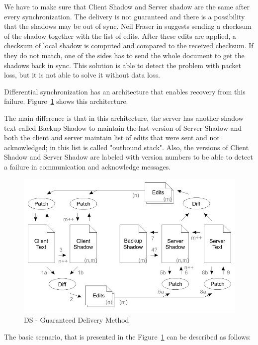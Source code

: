 \documentclass[12pt,oneside]{fithesis2}
\begin{document}
\par We have to make sure that Client Shadow and Server shadow are the same after every synchronization. The delivery is not guaranteed and there is a possibility that the shadows may be out of sync. Neil Fraser in \cite{Fraser} suggests sending a checksum of the shadow together with the list of edits. After these edits are applied, a checksum of local shadow is computed and compared to the received checksum. If they do not match, one of the sides has to send the whole document to get the shadows back in sync. This solution is able to detect the problem with packet loss, but it is not able to solve it without data loss.
\par Differential synchronization has an architecture that enables recovery from this failure. Figure~\ref{fig:ds2} shows this architecture.
\par The main difference is that in this architecture, the server has another shadow text called Backup Shadow to maintain the last version of Server Shadow and both the client and server maintain list of edits that were sent and not acknowledged; in \cite{Fraser} this list is called "outbound stack". Also, the versions of Client Shadow and Server Shadow are labeled with version numbers to be able to detect a failure in communication and acknowledge messages.
\begin{figure}[H]
\caption{DS - Guaranteed Delivery Method \cite{Fraser}}
\label{fig:ds2}
\centering
\vspace{5mm}
\includegraphics{diff2}
\end{figure}
\par The basic scenario, that is presented in the Figure~\ref{fig:ds2} can be described as follows:
\end{document}

